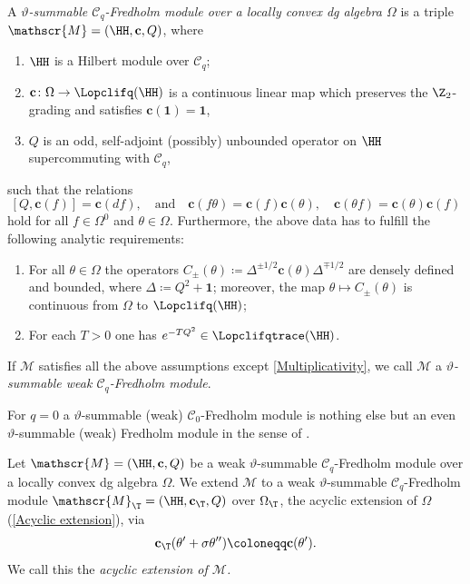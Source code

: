 \documentclass[a4paper, english, 12pt, bibliography=totocnumbered,
index=totoc]{scrartcl}
\begin{document}
\begin{defn}\label{Def FM}
	A \textit{$\vartheta$-summable $\mathcal{C}_q$-Fredholm module over a
	locally convex dg algebra $\Omega$} is a triple $\mathscr{M} = (\HH,
	\mathbf{c}, Q)$, where
	\begin{enumerate}[label=(\roman*)]
		\item $\HH$ is a Hilbert module over $\mathcal{C}_q$;
		\item $\mathbf{c} \colon \Omega \to \Lopclifq(\HH)$ is a
		continuous linear map which preserves the $\Z_2$-grading and 
		satisfies $\mathbf{c}(\mathbf{1}) = \mathbf{1}$,
		\item $Q$ is an odd, self-adjoint (possibly) unbounded operator on
		$\HH$ supercommuting with $\mathcal{C}_q$,
	\end{enumerate}
	such that the relations
	\begin{equation} \label{Multiplicativity}
		[Q, \mathbf{c}(f)] = \mathbf{c}(df), \quad \text{and} \quad
		\mathbf{c}(f\theta) = \mathbf{c}(f)\mathbf{c}(\theta), \quad
		\mathbf{c}(\theta f) = \mathbf{c}(\theta)\mathbf{c}(f)
	\end{equation}
	hold for all $f \in \Omega^0$ and $\theta \in \Omega$.
	Furthermore, the above data has to fulfill the following analytic 
	requirements:
	\begin{enumerate}
		\item[(A1)] For all $\theta\in \Omega$ the operators $C_\pm(\theta)
		\coloneqq \Delta^{\pm1/2}\mathbf{c}(\theta)\Delta^{\mp1/2}$ are
		densely defined and bounded, where $\Delta \coloneqq Q^2 + 
		\mathbf{1}$; moreover, the
		map $\theta \mapsto C_\pm(\theta)$ is continuous from $\Omega$
		to $\Lopclifq(\HH)$;
		\item[(A2)] For each $T>0$ one has $e^{-T Q^2}\in
		\Lopclifqtrace(\HH)$.
	\end{enumerate}
	If $\mathscr{M}$ satisfies all the above assumptions except
	\eqref{Multiplicativity}, we call $\mathscr{M}$ a
	\textit{$\vartheta$-summable weak
		$\mathcal{C}_q$-Fredholm module}.
\end{defn}
\begin{eg}
	For $q = 0$ a $\vartheta$-summable (weak) $\mathcal{C}_0$-Fredholm module
	is nothing else but an even $\vartheta$-summable (weak)
	Fredholm module in the sense of \cite[Definition 2.1]{GüneysuLudewig}.
\end{eg}
\begin{defn}\label{Acyclic extension FM}
	Let $\mathscr{M} = (\HH, \mathbf{c}, Q)$ be a weak $\vartheta$-summable
	$\mathcal{C}_q$-Fredholm module over a locally convex dg algebra $\Omega$.
	We extend $\mathscr{M}$ to a weak $\vartheta$-summable
	$\mathcal{C}_q$-Fredholm module $\mathscr{M}_\T = (\HH, \mathbf{c}_\T,
	Q)$ over $\Omega_\T$, the acyclic extension of $\Omega$ (\cref{Acyclic
		extension}), via
	\begin{equation*}
		\mathbf{c}_\T(\theta' + \sigma \theta'') \coloneqq
		\mathbf{c}(\theta').
	\end{equation*}
	We call this the \textit{acyclic extension of $\mathscr{M}$.}
\end{defn}
\end{document}
